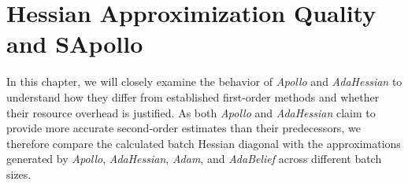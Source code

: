 \chapter{Hessian Approximization Quality and SApollo}\label{ch:mathtest} %
In this chapter, we will closely examine the behavior of \emph{Apollo} and \emph{AdaHessian} to understand how they differ from established first-order methods and whether their resource overhead is justified.
As both \emph{Apollo} and \emph{AdaHessian} claim to provide more accurate second-order estimates
than their predecessors, we therefore compare the calculated batch Hessian
diagonal with the approximations generated by \emph{Apollo}, \emph{AdaHessian}, \emph{Adam}, and \emph{AdaBelief}
across different batch sizes.

